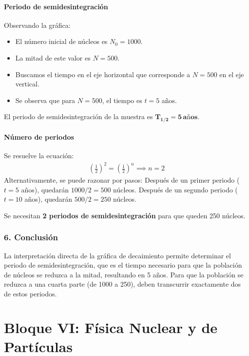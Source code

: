 \paragraph{Periodo de semidesintegración}
Observando la gráfica:
\begin{itemize}
    \item El número inicial de núcleos es $N_0 = 1000$.
    \item La mitad de este valor es $N = 500$.
    \item Buscamos el tiempo en el eje horizontal que corresponde a $N=500$ en el eje vertical.
    \item Se observa que para $N=500$, el tiempo es $t=5$ años.
\end{itemize}
\begin{cajaresultado}
El periodo de semidesintegración de la muestra es $\boldsymbol{T_{1/2} = 5\,\textbf{años}}$.
\end{cajaresultado}

\paragraph{Número de periodos}
Se resuelve la ecuación:
\begin{gather}
    \left(\frac{1}{2}\right)^{2} = \left(\frac{1}{2}\right)^{n} \implies n=2
\end{gather}
Alternativamente, se puede razonar por pasos:
Después de un primer periodo ($t=5$ años), quedarán $1000/2 = 500$ núcleos.
Después de un segundo periodo ($t=10$ años), quedarán $500/2 = 250$ núcleos.
\begin{cajaresultado}
Se necesitan \textbf{2 periodos de semidesintegración} para que queden 250 núcleos.
\end{cajaresultado}

\subsubsection*{6. Conclusión}
\begin{cajaconclusion}
La interpretación directa de la gráfica de decaimiento permite determinar el periodo de semidesintegración, que es el tiempo necesario para que la población de núcleos se reduzca a la mitad, resultando en 5 años. Para que la población se reduzca a una cuarta parte (de 1000 a 250), deben transcurrir exactamente dos de estos periodos.
\end{cajaconclusion}
\newpage

\section{Bloque VI: Física Nuclear y de Partículas}
\label{sec:nuclear_2017_jun_ord}

